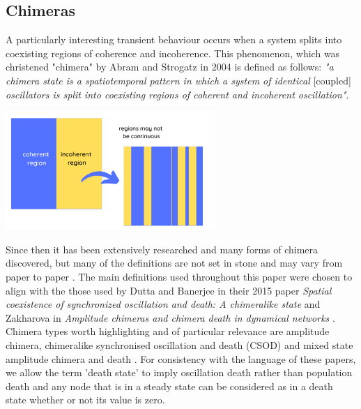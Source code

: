 \documentclass[12pt]{article}
\begin{document}
\subsection{Chimeras}
A particularly interesting transient behaviour occurs when a system splits into coexisting regions of coherence and incoherence. This phenomenon, which was christened "chimera" by Abram and Strogatz in 2004 is defined as follows: \textit{"a chimera state is a spatiotemporal pattern in which a system of identical} [coupled] \textit{oscillators is split into coexisting regions of coherent and incoherent oscillation"}.

\begin{center}
 \includegraphics[width=0.6\textwidth]{General Diagrams/chimera intro.png}
\label{fig: chimera diagram}
\end{center}
Since then it has been extensively researched and many forms of chimera discovered, but many of the definitions are not set in stone and may vary from paper to paper \cite{haugland2021changing}. The main definitions used throughout this paper were chosen to align with the those used by Dutta and Banerjee in their 2015 paper \textit{Spatial coexistence of synchronized oscillation and death: A chimeralike state} and Zakharova in \textit{Amplitude chimeras and chimera death in dynamical networks} \cite{dutta2015, zakharova2015}. Chimera types worth highlighting and of particular relevance are amplitude chimera, chimeralike synchronised oscillation and death (CSOD) and mixed state amplitude chimera and death \cite{dutta2015, zakharova2015}. For consistency with the language of these papers, we allow the term 'death state' to imply oscillation death rather than population death and any node that is in a steady state can be considered as in a death state whether or not its value is zero. \\ \\
\end{document}
